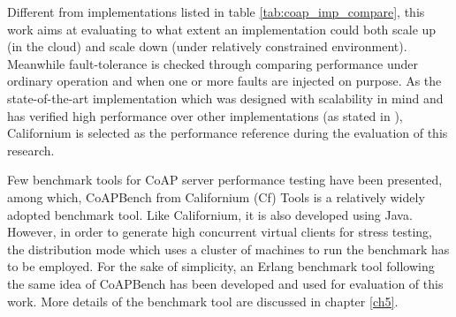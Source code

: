 Different from implementations listed in table \ref{tab:coap_imp_compare}, this work aims at evaluating to what extent an implementation could both scale up (in the cloud) and scale down (under relatively constrained environment).  Meanwhile fault-tolerance is checked through comparing performance under ordinary operation and when one or more faults are injected on purpose. As the state-of-the-art implementation which was designed with scalability in mind and has verified high performance over other implementations (as stated in \cite{kovatsch2014californium}\cite{kovatsch2015scalable}), Californium is selected as the performance reference during the evaluation of this research.

Few benchmark tools for CoAP server performance testing have been presented, among which, CoAPBench from Californium (Cf) Tools \cite{coapbench} is a relatively widely adopted benchmark tool. Like Californium, it is also developed using Java. However, in order to generate high concurrent virtual clients for stress testing, the distribution mode which uses a cluster of machines to run the benchmark has to be employed. For the sake of simplicity, an Erlang benchmark tool following the same idea of CoAPBench has been developed and used for evaluation of this work. More details of the benchmark tool are discussed in chapter \ref{ch5}.
